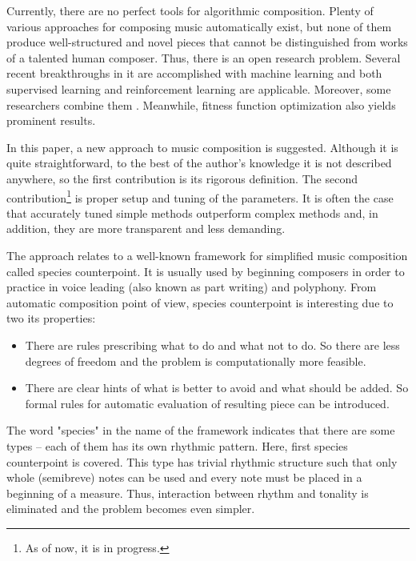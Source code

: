 \documentclass{article}
\begin{document}
Currently, there are no perfect tools for algorithmic composition. Plenty of various approaches for composing music automatically exist, but none of them produce well-structured and novel pieces that cannot be distinguished from works of a talented human composer. Thus, there is an open research problem. Several recent breakthroughs in it are accomplished with machine learning and both supervised learning \cite{johnson2017generating, payne2019musenet} and reinforcement learning \cite{yi2007automatic, smith2012reinforcement} are applicable. Moreover, some researchers combine them \cite{jaques2016generating, kotecha2018bach, kumar2019polyphonic}. Meanwhile, fitness function optimization also yields prominent results\cite{herremans2012first, herremans2013fifth}.

In this paper, a new approach to music composition is suggested. Although it is quite straightforward, to the best of the author's knowledge it is not described anywhere, so the first contribution is its rigorous definition. The second contribution\footnote{As of now, it is in progress.} is proper setup and tuning of the parameters. It is often the case that accurately tuned simple methods outperform complex methods \cite{dacrema2019are} and, in addition, they are more transparent and less demanding.

The approach relates to a well-known framework for simplified music composition called species counterpoint. It is usually used by beginning composers in order to practice in voice leading (also known as part writing) and polyphony. From automatic composition point of view, species counterpoint is interesting due to two its properties:
\begin{itemize}
	\item There are rules prescribing what to do and what not to do. So there are less degrees of freedom and the problem is computationally more feasible.
	\item There are clear hints of what is better to avoid and what should be added. So formal rules for automatic evaluation of resulting piece can be introduced.
\end{itemize}

The word "species" in the name of the framework indicates that there are some types -- each of them has its own rhythmic pattern. Here, first species counterpoint is covered. This type has trivial rhythmic structure such that only whole (semibreve) notes can be used and every note must be placed in a beginning of a measure. Thus, interaction between rhythm and tonality is eliminated and the problem becomes even simpler. 
\end{document}
